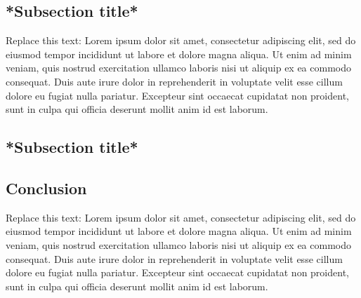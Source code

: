 \documentclass[a4paper, 10pt]{article}
\begin{document}
\begin{multicols*}{2}
\vspace{0.3cm}
\subsection{*Subsection title*}

Replace this text: Lorem ipsum dolor sit amet, consectetur adipiscing elit, sed do eiusmod tempor incididunt ut labore et dolore magna aliqua. Ut enim ad minim veniam, quis nostrud exercitation ullamco laboris nisi ut aliquip ex ea commodo consequat. Duis aute irure dolor in reprehenderit in voluptate velit esse cillum dolore eu fugiat nulla pariatur. Excepteur sint occaecat cupidatat non proident, sunt in culpa qui officia deserunt mollit anim id est laborum.



\vspace{0.3cm}
\subsection{*Subsection title*}




\vspace{0.3cm}
\subsection{Conclusion}

Replace this text: Lorem ipsum dolor sit amet, consectetur adipiscing elit, sed do eiusmod tempor incididunt ut labore et dolore magna aliqua. Ut enim ad minim veniam, quis nostrud exercitation ullamco laboris nisi ut aliquip ex ea commodo consequat. Duis aute irure dolor in reprehenderit in voluptate velit esse cillum dolore eu fugiat nulla pariatur. Excepteur sint occaecat cupidatat non proident, sunt in culpa qui officia deserunt mollit anim id est laborum.


\end{multicols*}



\newpage
\end{document}
